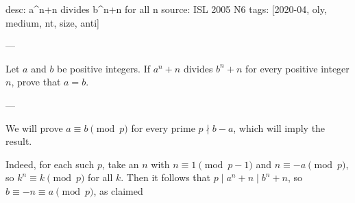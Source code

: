 desc: a^n+n divides b^n+n for all n
source: ISL 2005 N6
tags: [2020-04, oly, medium, nt, size, anti]

---

Let $a$ and $b$ be positive integers. If $a^n+n$ divides $b^n+n$ for every positive integer $n$, prove that $a=b$.

---

We will prove $a\equiv b\pmod p$ for every prime $p\nmid b-a$, which will imply the result.

Indeed, for each such $p$, take an $n$ with $n\equiv1\pmod{p-1}$ and $n\equiv-a\pmod p$, so $k^n\equiv k\pmod p$ for all $k$. Then it follows that $p\mid a^n+n\mid b^n+n$, so $b\equiv-n\equiv a\pmod p$, as claimed
